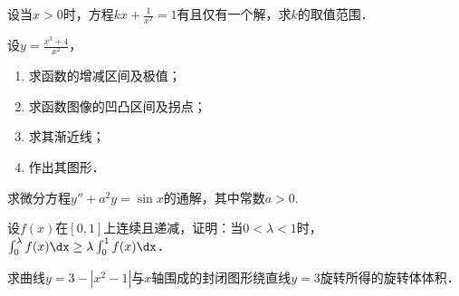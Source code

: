 \documentclass[plain,noanswer,medmath]{../../template/jnuexam}
\begin{document}
\begin{problem}
设当$x > 0$时，方程$kx + \frac{1}{x^2} = 1$有且仅有一个解，求$k$的取值范围．
\end{problem}



\begin{problem}
设$y = \frac{x^3 + 4}{x^2}$，
\begin{enumerate}
\item 求函数的增减区间及极值；
\item 求函数图像的凹凸区间及拐点；
\item 求其渐近线；
\item 作出其图形．
\end{enumerate}
\end{problem}



\begin{problem}
求微分方程$y'' + a^2 y = \sin x$的通解，其中常数$a > 0.$
\end{problem}



\begin{problem}
设$f(x)$在$[0,1]$上连续且递减，证明：当$0 < \lambda < 1$时，$\int_0^{\lambda}f(x)\dx \ge \lambda \int_0^1f(x)\dx$．
\end{problem}



\begin{problem}
求曲线$y = 3 - |x^2 - 1|$与$x$轴围成的封闭图形绕直线$y = 3$旋转所得的旋转体体积．
\end{problem}
\end{document}
